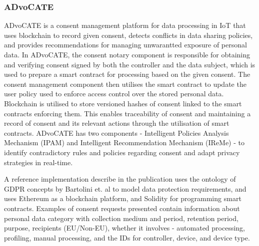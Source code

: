 \subsubsection{ADvoCATE}
ADvoCATE \cite{rantos_advocate_2019} is a consent management platform for data processing in IoT that uses blockchain to record given consent, detects conflicts in data sharing policies, and provides recommendations for managing unwarantted exposure of personal data. In ADvoCATE, the consent notary component is responsible for obtaining and verifying consent signed by both the controller and the data subject, which is used to prepare a smart contract for processing based on the given consent. The consent management component then utilises the smart contract to update the user policy used to enforce access control over the stored personal data. Blockchain is utilised to store versioned hashes of consent linked to the smart contracts enforcing them. This enables traceability of consent and maintaining a record of consent and its relevant actions through the utilisation of smart contracts.
ADvoCATE has two components - Intelligent Policies Analysis Mechanism (IPAM) and Intelligent Recommendation Mechanism (IReMe) - to identify contradictory rules and policies regarding consent and adapt privacy strategies in real-time. 

A reference implementation describe in the publication uses the ontology of GDPR concepts by Bartolini et. al \cite{bartolini_using_2015} to model data protection requirements, and uses Ethereum as a blockchain platform, and Solidity for programming smart contracts. Examples of consent requests presented contain information about personal data category with collection medium and period, retention period, purpose, recipients (EU/Non-EU), whether it involves - automated processing, profiling, manual processing, and the IDs for controller, device, and device type.

